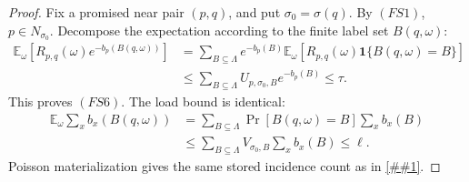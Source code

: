\documentclass[10pt]{article}
\newcommand{\cref}[1]{\ref{##1}}
\theoremstyle{definition}
\newcommand{\E}{\mathbb{E}}
\begin{document}
\begin{proof}
   Fix a promised near pair \((p,q)\), and put
   \(\sigma_0=\sigma(q)\).  By \((FS1)\), \(p\in N_{\sigma_0}\).  Decompose the
   expectation according to the finite label set \(B(q,\omega)\):
   \[
   \begin{aligned}
      \E_\omega\!\left[
         R_{p,q}(\omega)e^{-b_p(B(q,\omega))}
      \right]
      &=
      \sum_{B\subseteq\Lambda}
      e^{-b_p(B)}
      \E_\omega\!\left[
         R_{p,q}(\omega)\mathbf 1\{B(q,\omega)=B\}
      \right]  \\
      &\le
      \sum_{B\subseteq\Lambda}
      U_{p,\sigma_0,B}e^{-b_p(B)}
      \le \tau .
   \end{aligned}
   \]
   This proves \((FS6)\).  The load bound is identical:
   \[
   \begin{aligned}
      \E_\omega\sum_xb_x(B(q,\omega))
      &=
      \sum_{B\subseteq\Lambda}
      \Pr[B(q,\omega)=B]\sum_xb_x(B)\\
      &\le
      \sum_{B\subseteq\Lambda}
      V_{\sigma_0,B}\sum_xb_x(B)
      \le\ell .
   \end{aligned}
   \]
   Poisson materialization gives the same stored incidence count as in
   \cref{cor:rate-coverage-intensity}.
\end{proof}
\end{document}
